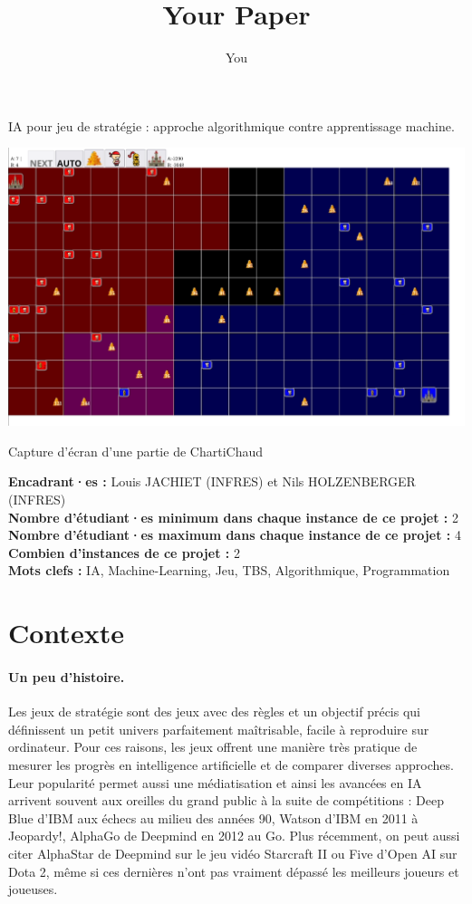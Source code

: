 \documentclass{article}
\title{Your Paper}
\author{You}
\begin{document}
\begin{center}
    \huge IA pour jeu de stratégie : approche algorithmique contre
    apprentissage machine.
\end{center}

\vspace{1cm}

\begin{center}
  \includegraphics[width=0.9\linewidth]{match}
  
  Capture d'écran d'une partie de ChartiChaud
\end{center}

\noindent \textbf{Encadrant·es :} Louis JACHIET (INFRES) et Nils HOLZENBERGER (INFRES)\\
\noindent \textbf{Nombre d'étudiant·es minimum dans chaque instance de
  ce projet :} 2\\
\noindent \textbf{Nombre d'étudiant·es maximum dans chaque instance de ce projet :} 4\\
\noindent \textbf{Combien d'instances de ce projet :} 2\\
\noindent \textbf{Mots clefs :} IA, Machine-Learning, Jeu, TBS, Algorithmique, Programmation


\section{Contexte}

\paragraph{Un peu d'histoire.}
Les jeux de stratégie sont des jeux avec des règles et un objectif
précis qui définissent un petit univers parfaitement maîtrisable, facile à reproduire sur ordinateur. Pour ces raisons, les jeux
offrent une manière très pratique de mesurer les progrès en
intelligence artificielle et de comparer diverses approches. Leur
popularité permet aussi une médiatisation et ainsi les avancées en IA
arrivent souvent aux oreilles du grand public à la suite de
compétitions : Deep Blue d'IBM aux échecs au milieu des années 90,
Watson d'IBM en 2011 à Jeopardy!, AlphaGo de Deepmind en 2012 au
Go. Plus récemment, on peut aussi citer AlphaStar de Deepmind sur le
jeu vidéo Starcraft II ou Five d'Open AI sur Dota 2, même si ces
dernières n'ont pas vraiment dépassé les meilleurs joueurs et
joueuses.
\end{document}
